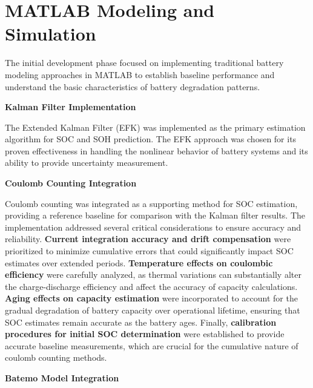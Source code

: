 \section{MATLAB Modeling and Simulation}
\label{sec:matlab_modeling}

The initial development phase focused on implementing traditional battery modeling approaches in MATLAB to establish baseline performance and understand the basic characteristics of battery degradation patterns.

\textbf{Kalman Filter Implementation}
\label{subsec:kalman_filter}

The Extended Kalman Filter (EFK) was implemented as the primary estimation algorithm for SOC and SOH prediction. The EFK approach was chosen for its proven effectiveness in handling the nonlinear behavior of battery systems and its ability to provide uncertainty measurement.

\textbf{Coulomb Counting Integration}
\label{subsec:coulomb_counting}

Coulomb counting was integrated as a supporting method for SOC estimation, providing a reference baseline for comparison with the Kalman filter results. The implementation addressed several critical considerations to ensure accuracy and reliability. \textbf{Current integration accuracy and drift compensation} were prioritized to minimize cumulative errors that could significantly impact SOC estimates over extended periods. \textbf{Temperature effects on coulombic efficiency} were carefully analyzed, as thermal variations can substantially alter the charge-discharge efficiency and affect the accuracy of capacity calculations. \textbf{Aging effects on capacity estimation} were incorporated to account for the gradual degradation of battery capacity over operational lifetime, ensuring that SOC estimates remain accurate as the battery ages. Finally, \textbf{calibration procedures for initial SOC determination} were established to provide accurate baseline measurements, which are crucial for the cumulative nature of coulomb counting methods.

\textbf{Batemo Model Integration}
\label{subsec:batemo_model}

